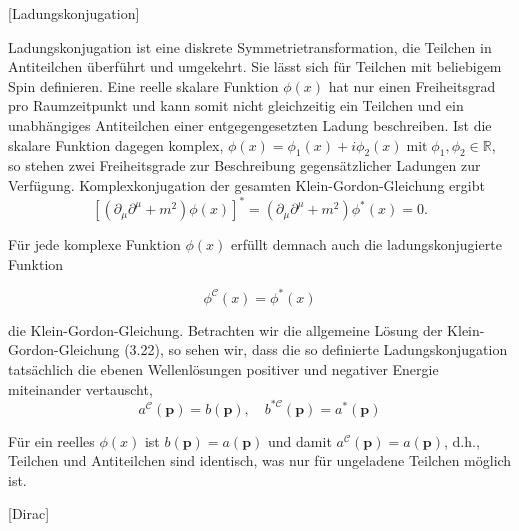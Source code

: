 \documentclass[10pt, letterpaper]{article}
\begin{document}
[Ladungskonjugation]

Ladungskonjugation ist eine diskrete Symmetrietransformation, die Teilchen in Antiteilchen überführt und umgekehrt. Sie lässt sich für Teilchen mit beliebigem Spin definieren. Eine reelle skalare Funktion $\phi(x)$ hat nur einen Freiheitsgrad pro Raumzeitpunkt und kann somit nicht gleichzeitig ein Teilchen und ein unabhängiges Antiteilchen einer entgegengesetzten Ladung beschreiben. Ist die skalare Funktion dagegen komplex, $\phi(x)=\phi_{1}(x)+i \phi_{2}(x) \operatorname{mit} \phi_{1}, \phi_{2} \in \mathbb{R}$, so stehen zwei Freiheitsgrade zur Beschreibung gegensätzlicher Ladungen zur Verfügung. Komplexkonjugation der gesamten Klein-Gordon-Gleichung ergibt
$$
\left[\left(\partial_{\mu} \partial^{\mu}+m^{2}\right) \phi(x)\right]^{*}=\left(\partial_{\mu} \partial^{\mu}+m^{2}\right) \phi^{*}(x)=0 .
$$

Für jede komplexe Funktion $\phi(x)$ erfüllt demnach auch die ladungskonjugierte Funktion

$$
\phi^{\mathcal{C}}(x)=\phi^{*}(x)
$$

die Klein-Gordon-Gleichung. Betrachten wir die allgemeine Lösung der Klein-Gordon-Gleichung (3.22), so sehen wir, dass die so definierte Ladungskonjugation tatsächlich die ebenen Wellenlösungen positiver und negativer Energie miteinander vertauscht,
$$
a^{\mathcal{C}}(\mathbf{p})=b(\mathbf{p}), \quad b^{* \mathcal{C}}(\mathbf{p})=a^{*}(\mathbf{p})
$$

Für ein reelles $\phi(x)$ ist $b(\mathbf{p})=a(\mathbf{p})$ und damit $a^{\mathcal{C}}(\mathbf{p})=a(\mathbf{p})$, d.h., Teilchen und Antiteilchen sind identisch, was nur für ungeladene Teilchen möglich ist.

[Dirac]
\end{document}

